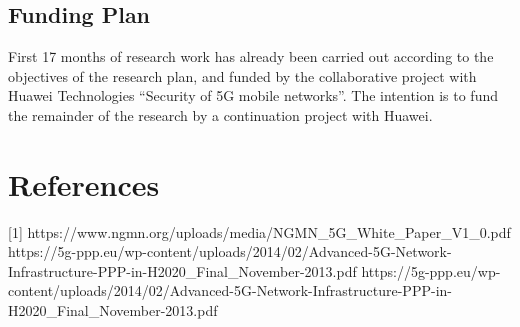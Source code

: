 \documentclass[14pt]{article}
\begin{document}
\begin{enumerate}
\section*{Funding Plan}
First 17 months of research work has already been carried out according to the objectives of the research plan, and funded by the collaborative project with Huawei Technologies \enquote{Security of 5G mobile networks}. The intention is to fund the remainder of the research by a continuation project with Huawei.

\end{enumerate}

\section{References}
[1] https://www.ngmn.org/uploads/media/NGMN\_5G\_White\_Paper\_V1\_0.pdf \newline\newline
[2] https://5g-ppp.eu/wp-content/uploads/2014/02/Advanced-5G-Network-Infrastructure-PPP-in-H2020\_Final\_November-2013.pdf \newline\newline
[2] https://5g-ppp.eu/wp-content/uploads/2014/02/Advanced-5G-Network-Infrastructure-PPP-in-H2020\_Final\_November-2013.pdf \newline\newline
\end{document}
